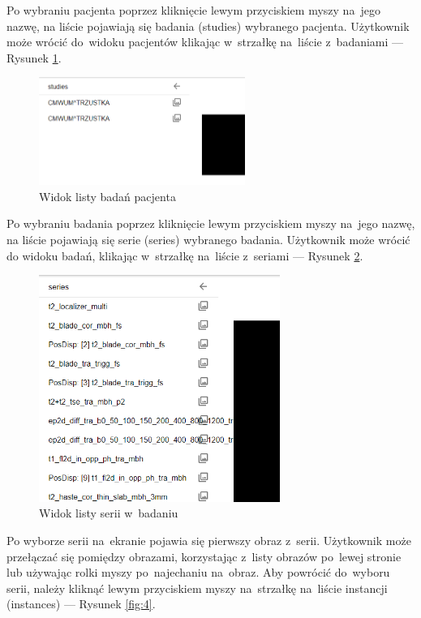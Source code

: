 \documentclass[a4paper,11pt,twoside,openright]{report}
\theoremstyle{definition}
\begin{document}
Po wybraniu pacjenta poprzez kliknięcie lewym przyciskiem myszy na~jego nazwę,
na liście pojawiają się badania (studies) wybranego pacjenta. Użytkownik może
wrócić do~widoku pacjentów klikając w~strzałkę na~liście z~badaniami --- Rysunek \ref{fig:2}.

\begin{figure}[h!]
	\center
	\includegraphics[width=0.6\textwidth]{2}
	\caption{Widok listy badań pacjenta}
    	\label{fig:2}
\end{figure}

\pagebreak

Po wybraniu badania poprzez kliknięcie lewym przyciskiem myszy na~jego nazwę,
na liście pojawiają się serie (series) wybranego badania. Użytkownik może wrócić
do widoku badań, klikając w~strzałkę na~liście z~seriami --- Rysunek \ref{fig:3}.

\begin{figure}[h!]
	\center
	\includegraphics[width=0.7\textwidth]{3}
	\caption{Widok listy serii w~badaniu}
    	\label{fig:3}
\end{figure}

Po wyborze serii na~ekranie pojawia się pierwszy obraz z~serii. Użytkownik
może przełączać się pomiędzy obrazami, korzystając z~listy obrazów po~lewej
stronie lub używając rolki myszy po~najechaniu na~obraz. Aby powrócić do~wyboru
serii, należy kliknąć lewym przyciskiem myszy na~strzałkę na~liście instancji
(instances) --- Rysunek \ref{fig:4}.
\end{document}
